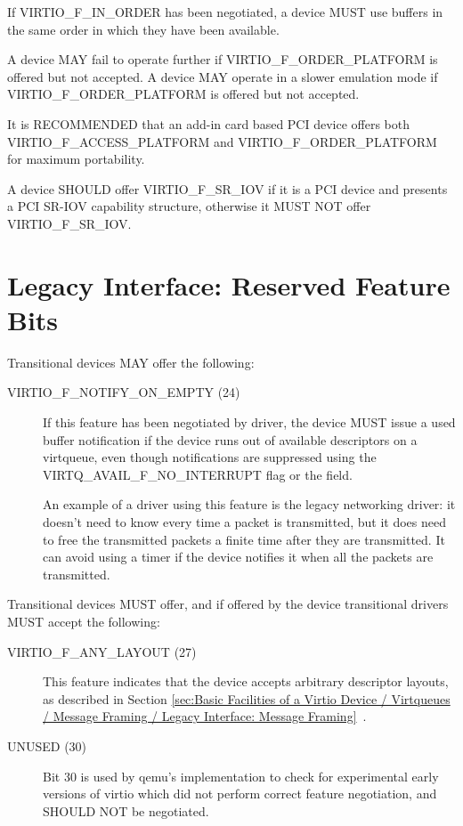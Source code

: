 If VIRTIO_F_IN_ORDER has been negotiated, a device MUST use
buffers in the same order in which they have been available.

A device MAY fail to operate further if
VIRTIO_F_ORDER_PLATFORM is offered but not accepted.
A device MAY operate in a slower emulation mode if
VIRTIO_F_ORDER_PLATFORM is offered but not accepted.

It is RECOMMENDED that an add-in card based PCI device
offers both VIRTIO_F_ACCESS_PLATFORM and
VIRTIO_F_ORDER_PLATFORM for maximum portability.

A device SHOULD offer VIRTIO_F_SR_IOV if it is a PCI device
and presents a PCI SR-IOV capability structure, otherwise
it MUST NOT offer VIRTIO_F_SR_IOV.

\section{Legacy Interface: Reserved Feature Bits}\label{sec:Reserved Feature Bits / Legacy Interface: Reserved Feature Bits}

Transitional devices MAY offer the following:
\begin{description}
\item[VIRTIO_F_NOTIFY_ON_EMPTY (24)] If this feature
  has been negotiated by driver, the device MUST issue
  a used buffer notification if the device runs
  out of available descriptors on a virtqueue, even though
  notifications are suppressed using the VIRTQ_AVAIL_F_NO_INTERRUPT
  flag or the  field.
\begin{note}
  An example of a driver using this feature is the legacy
  networking driver: it doesn't need to know every time a packet
  is transmitted, but it does need to free the transmitted
  packets a finite time after they are transmitted. It can avoid
  using a timer if the device notifies it when all the packets
  are transmitted.
\end{note}
\end{description}

Transitional devices MUST offer, and if offered by the device
transitional drivers MUST accept the following:
\begin{description}
\item[VIRTIO_F_ANY_LAYOUT (27)] This feature indicates that the device
  accepts arbitrary descriptor layouts, as described in Section
  \ref{sec:Basic Facilities of a Virtio Device / Virtqueues / Message Framing / Legacy Interface: Message Framing}~.

\item[UNUSED (30)] Bit 30 is used by qemu's implementation to check
  for experimental early versions of virtio which did not perform
  correct feature negotiation, and SHOULD NOT be negotiated.
\end{description}
